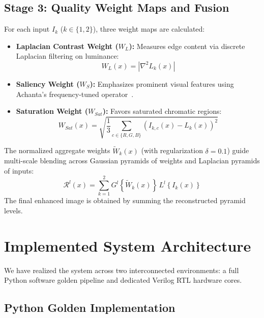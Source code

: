 \documentclass[10pt,twocolumn,letterpaper]{article}
\begin{document}
\subsection{Stage 3: Quality Weight Maps and Fusion}

For each input $I_k$ ($k \in \{1,2\}$), three weight maps are calculated:
\begin{itemize}
  \item \textbf{Laplacian Contrast Weight ($W_L$):} Measures edge content via discrete Laplacian filtering on luminance:
  \begin{equation}
    W_L(x) = |\nabla^2 L_k(x)|
    \label{eq:wl}
  \end{equation}
  \item \textbf{Saliency Weight ($W_S$):} Emphasizes prominent visual features using Achanta's frequency-tuned operator~\cite{achanta2009frequency}.
  \item \textbf{Saturation Weight ($W_{Sat}$):} Favors saturated chromatic regions:
  \begin{equation}
    W_{Sat}(x) = \sqrt{\frac{1}{3} \sum_{c\in\{R,G,B\}} (I_{k,c}(x) - L_k(x))^2}
    \label{eq:wsat}
  \end{equation}
\end{itemize}

The normalized aggregate weights $\tilde{W}_k(x)$ (with regularization $\delta = 0.1$) guide multi-scale blending across Gaussian pyramids of weights and Laplacian pyramids of inputs:
\begin{equation}
  \mathcal{R}^l(x) = \sum_{k=1}^{2} G^l\!\left\{\tilde{W}_k(x)\right\}\, L^l\!\left\{I_k(x)\right\}
  \label{eq:fusion}
\end{equation}
The final enhanced image is obtained by summing the reconstructed pyramid levels.

\section{Implemented System Architecture}
\label{sec:implementation}

We have realized the system across two interconnected environments: a full Python software golden pipeline and dedicated Verilog RTL hardware cores.

\subsection{Python Golden Implementation}
\end{document}
